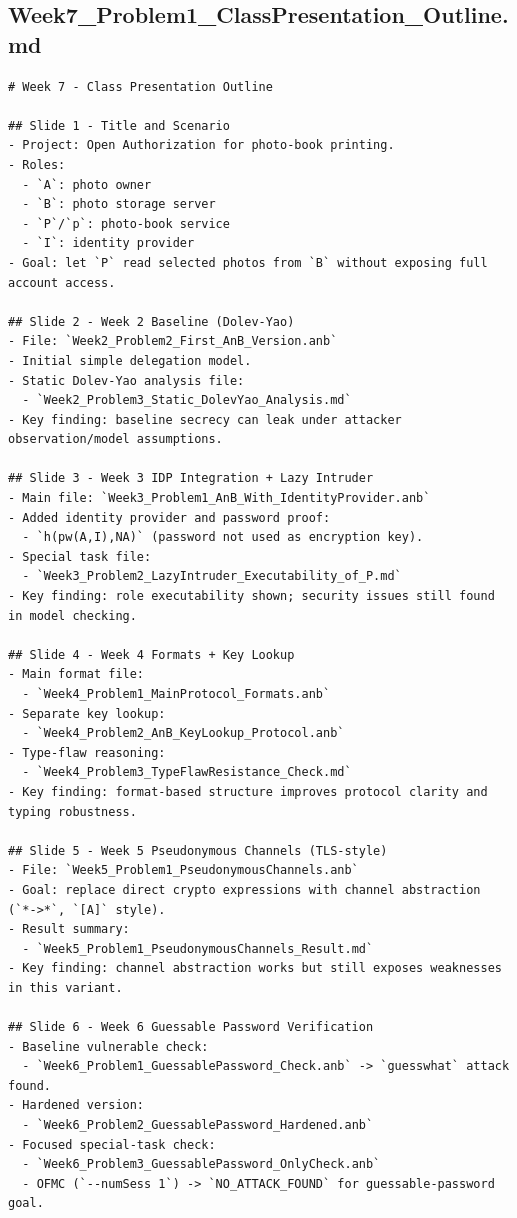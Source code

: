 \documentclass[11pt,a4paper]{article}
\begin{document}
\subsection{Week7\_Problem1\_ClassPresentation\_Outline.md}
\begin{lstlisting}
# Week 7 - Class Presentation Outline

## Slide 1 - Title and Scenario
- Project: Open Authorization for photo-book printing.
- Roles:
  - `A`: photo owner
  - `B`: photo storage server
  - `P`/`p`: photo-book service
  - `I`: identity provider
- Goal: let `P` read selected photos from `B` without exposing full account access.

## Slide 2 - Week 2 Baseline (Dolev-Yao)
- File: `Week2_Problem2_First_AnB_Version.anb`
- Initial simple delegation model.
- Static Dolev-Yao analysis file:
  - `Week2_Problem3_Static_DolevYao_Analysis.md`
- Key finding: baseline secrecy can leak under attacker observation/model assumptions.

## Slide 3 - Week 3 IDP Integration + Lazy Intruder
- Main file: `Week3_Problem1_AnB_With_IdentityProvider.anb`
- Added identity provider and password proof:
  - `h(pw(A,I),NA)` (password not used as encryption key).
- Special task file:
  - `Week3_Problem2_LazyIntruder_Executability_of_P.md`
- Key finding: role executability shown; security issues still found in model checking.

## Slide 4 - Week 4 Formats + Key Lookup
- Main format file:
  - `Week4_Problem1_MainProtocol_Formats.anb`
- Separate key lookup:
  - `Week4_Problem2_AnB_KeyLookup_Protocol.anb`
- Type-flaw reasoning:
  - `Week4_Problem3_TypeFlawResistance_Check.md`
- Key finding: format-based structure improves protocol clarity and typing robustness.

## Slide 5 - Week 5 Pseudonymous Channels (TLS-style)
- File: `Week5_Problem1_PseudonymousChannels.anb`
- Goal: replace direct crypto expressions with channel abstraction (`*->*`, `[A]` style).
- Result summary:
  - `Week5_Problem1_PseudonymousChannels_Result.md`
- Key finding: channel abstraction works but still exposes weaknesses in this variant.

## Slide 6 - Week 6 Guessable Password Verification
- Baseline vulnerable check:
  - `Week6_Problem1_GuessablePassword_Check.anb` -> `guesswhat` attack found.
- Hardened version:
  - `Week6_Problem2_GuessablePassword_Hardened.anb`
- Focused special-task check:
  - `Week6_Problem3_GuessablePassword_OnlyCheck.anb`
  - OFMC (`--numSess 1`) -> `NO_ATTACK_FOUND` for guessable-password goal.


\end{lstlisting}
\end{document}
